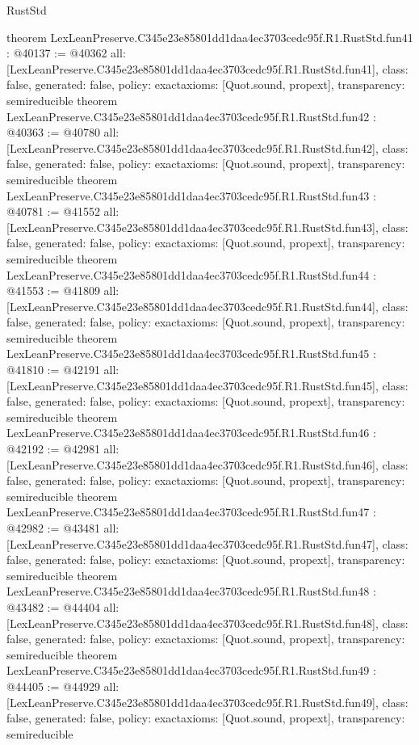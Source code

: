 \begin{lexlean}{RustStd}
\begin{coremodule}
{}
theorem LexLeanPreserve.C345e23e85801dd1daa4ec3703cedc95f.R1.RustStd.fun41 : @40137 := @40362 {
  all: [LexLeanPreserve.C345e23e85801dd1daa4ec3703cedc95f.R1.RustStd.fun41],
  class: false,
  generated: false,
  policy: exact{axioms: [Quot.sound, propext]},
  transparency: semireducible
}
theorem LexLeanPreserve.C345e23e85801dd1daa4ec3703cedc95f.R1.RustStd.fun42 : @40363 := @40780 {
  all: [LexLeanPreserve.C345e23e85801dd1daa4ec3703cedc95f.R1.RustStd.fun42],
  class: false,
  generated: false,
  policy: exact{axioms: [Quot.sound, propext]},
  transparency: semireducible
}
theorem LexLeanPreserve.C345e23e85801dd1daa4ec3703cedc95f.R1.RustStd.fun43 : @40781 := @41552 {
  all: [LexLeanPreserve.C345e23e85801dd1daa4ec3703cedc95f.R1.RustStd.fun43],
  class: false,
  generated: false,
  policy: exact{axioms: [Quot.sound, propext]},
  transparency: semireducible
}
theorem LexLeanPreserve.C345e23e85801dd1daa4ec3703cedc95f.R1.RustStd.fun44 : @41553 := @41809 {
  all: [LexLeanPreserve.C345e23e85801dd1daa4ec3703cedc95f.R1.RustStd.fun44],
  class: false,
  generated: false,
  policy: exact{axioms: [Quot.sound, propext]},
  transparency: semireducible
}
theorem LexLeanPreserve.C345e23e85801dd1daa4ec3703cedc95f.R1.RustStd.fun45 : @41810 := @42191 {
  all: [LexLeanPreserve.C345e23e85801dd1daa4ec3703cedc95f.R1.RustStd.fun45],
  class: false,
  generated: false,
  policy: exact{axioms: [Quot.sound, propext]},
  transparency: semireducible
}
theorem LexLeanPreserve.C345e23e85801dd1daa4ec3703cedc95f.R1.RustStd.fun46 : @42192 := @42981 {
  all: [LexLeanPreserve.C345e23e85801dd1daa4ec3703cedc95f.R1.RustStd.fun46],
  class: false,
  generated: false,
  policy: exact{axioms: [Quot.sound, propext]},
  transparency: semireducible
}
theorem LexLeanPreserve.C345e23e85801dd1daa4ec3703cedc95f.R1.RustStd.fun47 : @42982 := @43481 {
  all: [LexLeanPreserve.C345e23e85801dd1daa4ec3703cedc95f.R1.RustStd.fun47],
  class: false,
  generated: false,
  policy: exact{axioms: [Quot.sound, propext]},
  transparency: semireducible
}
theorem LexLeanPreserve.C345e23e85801dd1daa4ec3703cedc95f.R1.RustStd.fun48 : @43482 := @44404 {
  all: [LexLeanPreserve.C345e23e85801dd1daa4ec3703cedc95f.R1.RustStd.fun48],
  class: false,
  generated: false,
  policy: exact{axioms: [Quot.sound, propext]},
  transparency: semireducible
}
theorem LexLeanPreserve.C345e23e85801dd1daa4ec3703cedc95f.R1.RustStd.fun49 : @44405 := @44929 {
  all: [LexLeanPreserve.C345e23e85801dd1daa4ec3703cedc95f.R1.RustStd.fun49],
  class: false,
  generated: false,
  policy: exact{axioms: [Quot.sound, propext]},
  transparency: semireducible
}
\end{coremodule}
\end{lexlean}
